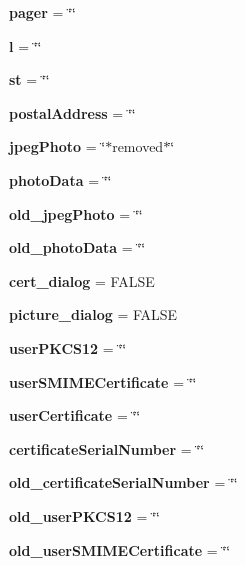 \begin{CompactItemize}
\item 
{\bf pager} = \char`\"{}\char`\"{}\label{classuser_o16}

\item 
{\bf l} = \char`\"{}\char`\"{}\label{classuser_o17}

\item 
{\bf st} = \char`\"{}\char`\"{}\label{classuser_o18}

\item 
{\bf postal\-Address} = \char`\"{}\char`\"{}\label{classuser_o19}

\item 
{\bf jpeg\-Photo} = \char`\"{}$\ast$removed$\ast$\char`\"{}\label{classuser_o20}

\item 
{\bf photo\-Data} = \char`\"{}\char`\"{}\label{classuser_o21}

\item 
{\bf old\_\-jpeg\-Photo} = \char`\"{}\char`\"{}\label{classuser_o22}

\item 
{\bf old\_\-photo\-Data} = \char`\"{}\char`\"{}\label{classuser_o23}

\item 
{\bf cert\_\-dialog} = FALSE\label{classuser_o24}

\item 
{\bf picture\_\-dialog} = FALSE\label{classuser_o25}

\item 
{\bf user\-PKCS12} = \char`\"{}\char`\"{}\label{classuser_o26}

\item 
{\bf user\-SMIMECertificate} = \char`\"{}\char`\"{}\label{classuser_o27}

\item 
{\bf user\-Certificate} = \char`\"{}\char`\"{}\label{classuser_o28}

\item 
{\bf certificate\-Serial\-Number} = \char`\"{}\char`\"{}\label{classuser_o29}

\item 
{\bf old\_\-certificate\-Serial\-Number} = \char`\"{}\char`\"{}\label{classuser_o30}

\item 
{\bf old\_\-user\-PKCS12} = \char`\"{}\char`\"{}\label{classuser_o31}

\item 
{\bf old\_\-user\-SMIMECertificate} = \char`\"{}\char`\"{}\label{classuser_o32}


\end{CompactItemize}

